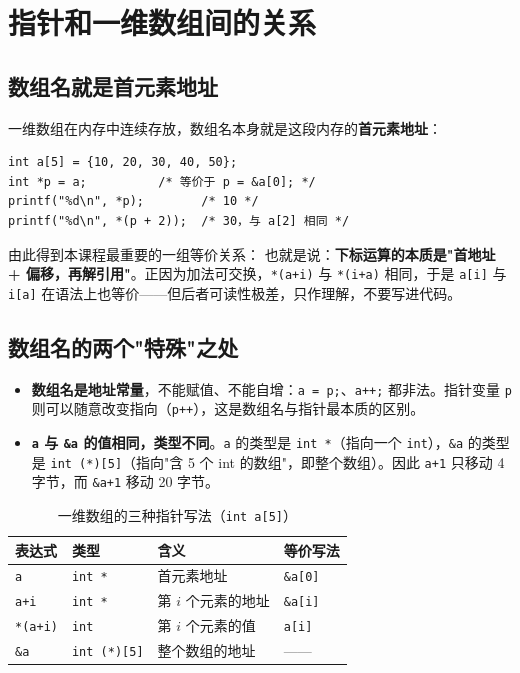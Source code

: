 \providecommand{\nul}{\texttt{'\textbackslash0'}}

\section{指针和一维数组间的关系}
\subsection{数组名就是首元素地址}
一维数组在内存中连续存放，数组名本身就是这段内存的\textbf{首元素地址}：
\begin{lstlisting}
int a[5] = {10, 20, 30, 40, 50};
int *p = a;          /* 等价于 p = &a[0]; */
printf("%d\n", *p);        /* 10 */
printf("%d\n", *(p + 2));  /* 30，与 a[2] 相同 */
\end{lstlisting}
由此得到本课程最重要的一组等价关系：
也就是说：\textbf{下标运算的本质是"首地址 + 偏移，再解引用"}。正因为加法可交换，\texttt{*(a+i)} 与 \texttt{*(i+a)} 相同，于是 \texttt{a[i]} 与 \texttt{i[a]} 在语法上也等价——但后者可读性极差，只作理解，不要写进代码。

\subsection{数组名的两个"特殊"之处}
\begin{itemize}
  \item \textbf{数组名是地址常量}，不能赋值、不能自增：\texttt{a = p;}、\texttt{a++;} 都非法。指针变量 \texttt{p} 则可以随意改变指向（\texttt{p++}），这是数组名与指针最本质的区别。
  \item \textbf{\texttt{a} 与 \texttt{\&a} 的值相同，类型不同}。\texttt{a} 的类型是 \texttt{int *}（指向一个 \texttt{int}），\texttt{\&a} 的类型是 \texttt{int (*)[5]}（指向"含 5 个 int 的数组"，即整个数组）。因此 \texttt{a+1} 只移动 4 字节，而 \texttt{\&a+1} 移动 20 字节。
\end{itemize}

\begin{table}[htbp]
\centering
\caption{一维数组的三种指针写法（\texttt{int a[5]}）}
\footnotesize
\begin{tabular}{@{}llll@{}}
\toprule
表达式 & 类型 & 含义 & 等价写法 \\
\midrule
\texttt{a} & \texttt{int *} & 首元素地址 & \texttt{\&a[0]} \\
\texttt{a+i} & \texttt{int *} & 第 $i$ 个元素的地址 & \texttt{\&a[i]} \\
\texttt{*(a+i)} & \texttt{int} & 第 $i$ 个元素的值 & \texttt{a[i]} \\
\texttt{\&a} & \texttt{int (*)[5]} & 整个数组的地址 & —— \\
\bottomrule
\end{tabular}
\end{table}


